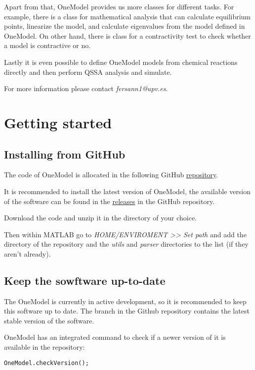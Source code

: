 \documentclass[11pt]{article}
\begin{document}
Apart from that, OneModel provides us more classes for different tasks. For example, there is a class for mathematical analysis that can calculate equilibrium points, linearize the model, and calculate eigenvalues from the model defined in OneModel. On other hand, there is class for a contractivity test to check whether a model is contractive or no.

Lastly it is even possible to define OneModel models from chemical reactions directly and then perform QSSA analysis and simulate.

For more information please contact \textit{fersann1@upv.es}.

\section{Getting started}

\subsection{Installing from GitHub}

The code of OneModel is allocated in the following GitHub \href{https://github.com/sb2cl/OneModel}{repository}.

It is recommended to install the latest version of OneModel, the available version of the software can be found in the \href{https://github.com/sb2cl/OneModel/releases}{releases} in the GitHub repository.

Download the code and unzip it in the directory of your choice.

Then within MATLAB go to \textit{HOME/ENVIROMENT >> Set path} and add the directory of the repository and the \textit{utils} and \textit{parser} directories to the list (if they aren't already).

\subsection{Keep the sowftware up-to-date}

The OneModel is currently in active development, so it is recommended to keep this software up to date. The  branch in the Github repository contains the latest stable version of the software.

OneModel has an integrated command to check if a newer version of it is available in the repository:
\begin{lstlisting}
OneModel.checkVersion();
\end{lstlisting}
\end{document}
